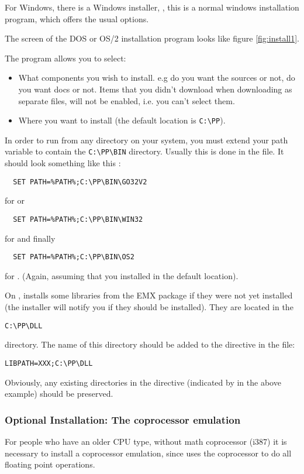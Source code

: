 For Windows, there is a Windows installer, , this is a normal 
windows installation program, which offers the usual options.

The screen of the DOS or OS/2 installation program looks like figure 
\ref{fig:install1}.


The program allows you to select:
\begin{itemize}
\item What components you wish to install. e.g do you want the sources or
not, do you want docs or not. Items that you didn't download when
downloading as separate files, will not be enabled, i.e. you can't
select them.

\item Where you want to install (the default location is \verb|C:\PP|).
\end{itemize}

In order to run \fpc from any directory on your system, you must extend
your path variable to contain the \verb|C:\PP\BIN| directory.
Usually this is done in the  file.
It should look something like this :
\begin{verbatim}
  SET PATH=%PATH%;C:\PP\BIN\GO32V2
\end{verbatim}
for \dos or 
\begin{verbatim}
  SET PATH=%PATH%;C:\PP\BIN\WIN32
\end{verbatim}
for \windows and finally
\begin{verbatim}
  SET PATH=%PATH%;C:\PP\BIN\OS2
\end{verbatim}
for \ostwo.
(Again, assuming that you installed in the default location).

On \ostwo, \fpc installs some libraries from the EMX package if they
were not yet installed (the installer will notify you if they should be
installed). They are located in the 
\begin{verbatim}
C:\PP\DLL
\end{verbatim}
directory. The name of this directory should be added to the 
directive in the  file:
\begin{verbatim}
LIBPATH=XXX;C:\PP\DLL
\end{verbatim}
Obviously, any existing directories in the  directive
(indicated by  in the above example) should be preserved.

\subsubsection{Optional Installation: The coprocessor emulation}
For people who have an older CPU type, without math coprocessor (i387)
it is necessary to install a coprocessor emulation, since \fpc uses the
coprocessor to do all floating point operations.

